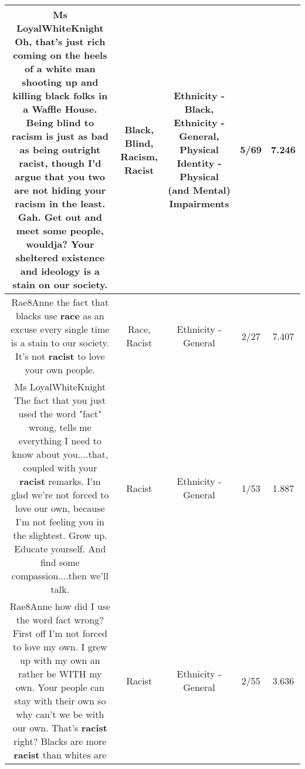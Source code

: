 \documentclass[11pt]{article}
\newlength\mylength
\begin{document}
\begin{center}
\begin{longtable}{|C{.65\mylength}|C{.30\mylength}|C{.12\mylength}|C{.12\mylength}|C{.12\mylength}|}
  \small Ms LoyalWhiteKnight  Oh, that's just rich coming on the heels of a white man shooting up and killing \textbf{black} folks in a Waffle House.  Being \textbf{blind} to \textbf{racism} is just as bad as being outright \textbf{racist}, though I'd argue that you two are not hiding your \textbf{racism} in the least. Gah.  Get out and meet some people, wouldja? Your sheltered existence and ideology is a stain on our society.\normalsize   & Black, Blind, Racism, Racist & Ethnicity - Black, Ethnicity - General, Physical Identity - Physical (and Mental) Impairments & 5/69 & 7.246 \\  \hline
  \small Rae8Anne the fact that blacks use \textbf{race} as an excuse every single time is a stain to our society. It's not \textbf{racist} to love your own people.\normalsize   & Race, Racist & Ethnicity - General & 2/27 & 7.407 \\  \hline
  \small Ms LoyalWhiteKnight  The fact that you just used the word "fact" wrong, tells me everything I need to know about you....that, coupled with your \textbf{racist} remarks. I'm glad we're not forced to love our own, because I'm not feeling you in the slightest. Grow up. Educate yourself. And find some compassion....then we'll talk.\normalsize   & Racist & Ethnicity - General & 1/53 & 1.887 \\  \hline
  \small Rae8Anne how did I use the word fact wrong? First off I'm not forced to love my own. I grew up with my own an rather be WITH my own. Your people can stay with their own so why can't we be with our own. That's \textbf{racist} right? Blacks are more \textbf{racist} than whites are\normalsize   & Racist & Ethnicity - General & 2/55 & 3.636 \\  \hline

\end{longtable}
\end{center}
\end{document}
